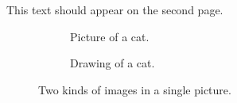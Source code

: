 \documentclass[11pt]{article}
\begin{document}
    \newpage
    This text should appear on the second page.

    \begin{figure}
        \centering
        \begin{subfigure}[b]{.5\textwidth}
            \centering
            \caption{Picture of a cat.}
        \end{subfigure}%
        \begin{subfigure}[b]{.5\textwidth}
            \centering
            \caption{Drawing of a cat.}
        \end{subfigure}
        \caption{Two kinds of images in a single picture.}
        \label{fig:cats}
    \end{figure}
\end{document}
